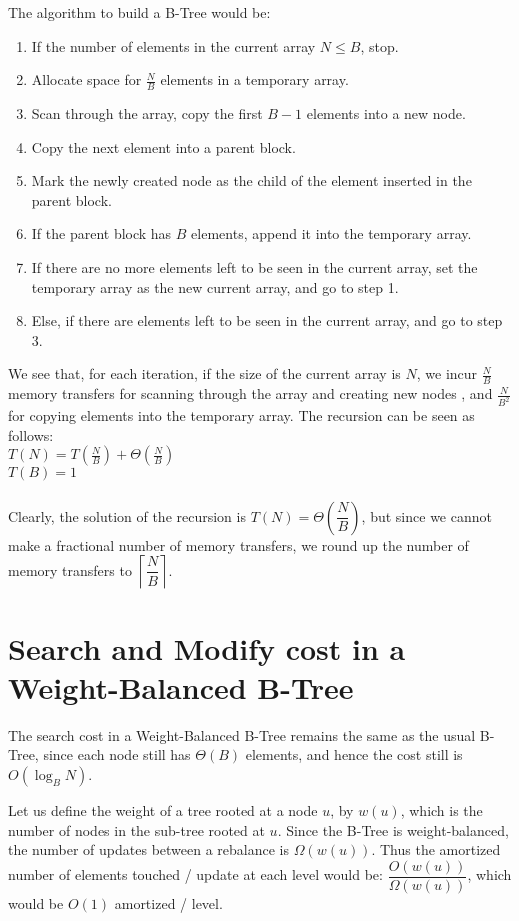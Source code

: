 \documentclass{article}
\begin{document}
The algorithm to build a B-Tree would be:
\begin{enumerate}
\item If the number of elements in the current array $N \leq B $, stop.
\item Allocate space for $\frac{N}{B}$ elements in a temporary array.
\item Scan through the array, copy the first $B-1$ elements into a new node.
\item Copy the next element into a parent block. 
\item Mark the newly created node as the child of the element inserted in the parent block.
\item If the parent block has $B$ elements, append it into the temporary array.
\item If there are no more elements left to be seen in the current array, set the temporary
array as the new current array, and go to step 1.
\item Else, if there are elements left to be seen in the current array, and go to step 3.
\end{enumerate}

We see that, for each iteration, if the size of the current array is $N$, we incur
$\frac{N}{B}$ memory transfers for scanning through the array and creating new nodes
, and $\frac{N}{B^2}$ for copying elements into the temporary array. The recursion
can be seen as follows:\\

$T(N) = T(\frac{N}{B}) + \Theta(\frac{N}{B})$ \\
$T(B) = 1$\\
\\
Clearly, the solution of the recursion is $T(N) = \Theta\left(\dfrac{N}{B}\right)$, but since we cannot
make a fractional number of memory transfers, we round up the number of memory transfers
to $\left\lceil \dfrac{N}{B} \right\rceil$.

\clearpage

\clearpage

\section {Search and Modify cost in a Weight-Balanced B-Tree}
The search cost in a Weight-Balanced B-Tree remains the same as the usual
B-Tree, since each node still has $\Theta(B)$ elements, and hence the cost still is
$O(\log_B{N})$.

Let us define the weight of a tree rooted at a node $u$, by $w(u)$, which is the
number of nodes in the sub-tree rooted at $u$. Since the B-Tree is weight-balanced,
the number of updates between a rebalance is $\Omega(w(u))$. Thus the 
amortized number of elements touched / update at each level would be: 
$\dfrac{O(w(u))}{\Omega(w(u))}$, which would be $O(1)$ amortized / level. 
\end{document}
